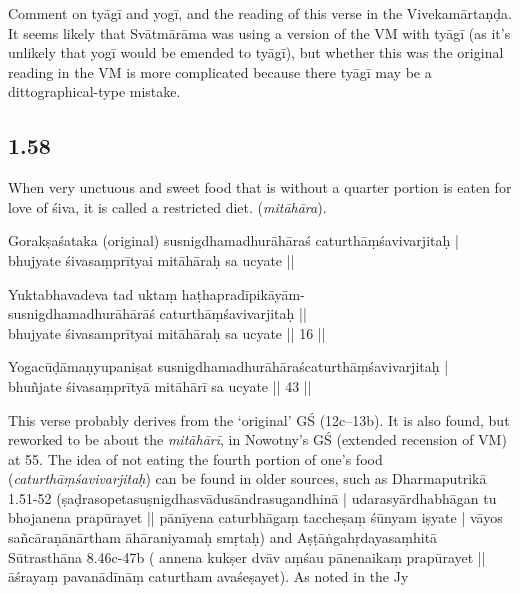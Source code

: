 \begin{ekdosis}
\begin{philcomm}[hp01_057]
Comment on tyāgī and yogī, and the reading of this verse in the Vivekamārtaṇḍa. It seems likely that Svātmārāma was using a version of the VM with tyāgī (as it’s unlikely that yogī would be emended to tyāgī), but whether this was the original reading in the VM is more complicated because there tyāgī may be a dittographical-type mistake. 
\end{philcomm}

\subsection*{1.58}
\begin{translation}[hp01_058]
When very unctuous and sweet food that is without a quarter portion is eaten for love of śiva, it is called a restricted diet. (\emph{mitāhāra}).
\end{translation}

\begin{sources}[hp01_058]
Gorakṣaśataka (original)
\startverse
susnigdhamadhurāhāraś caturthāṃśavivarjitaḥ |\\
bhujyate śivasaṃprītyai mitāhāraḥ sa ucyate ||
\endverse
\end{sources}

\begin{testimonia}[hp01_058]
Yuktabhavadeva
\startverse
tad uktaṃ haṭhapradīpikāyām-\\
susnigdhamadhurāhārāś caturthāṃśavivarjitaḥ ||\\
bhujyate śivasamprītyai mitāhāraḥ sa ucyate || 16 ||
\endverse

Yogacūḍāmaṇyupaniṣat
\startverse
susnigdhamadhurāhāraścaturthāṃśavivarjitaḥ |\\
bhuñjate śivasaṃprītyā mitāhārī sa ucyate || 43 ||
\endverse
\end{testimonia}

\begin{philcomm}[hp01_058]
This verse probably derives from the ‘original’ GŚ (12c–13b). It is also found, but reworked to be about the \emph{mitāhārī}, in Nowotny’s GŚ (extended recension of VM) at 55. The idea of not eating the fourth portion of one’s food (\emph{caturthāṃśavivarjitaḥ}) can be found in older sources, such as Dharmaputrikā 1.51-52 (ṣaḍrasopetasuṣnigdhasvādusāndrasugandhinā |
udarasyārdhabhāgan tu bhojanena prapūrayet || pānīyena caturbhāgaṃ taccheṣaṃ śūnyam iṣyate | vāyos sañcāraṇānārtham āhāraniyamaḥ smṛtaḥ) and Aṣṭāṅgahṛdayasaṃhitā Sūtrasthāna 8.46c-47b ( annena kukṣer dvāv aṃśau pānenaikaṃ prapūrayet ||āśrayaṃ pavanādīnāṃ caturtham avaśeṣayet). As noted in the Jy


\end{philcomm}
\end{ekdosis}
